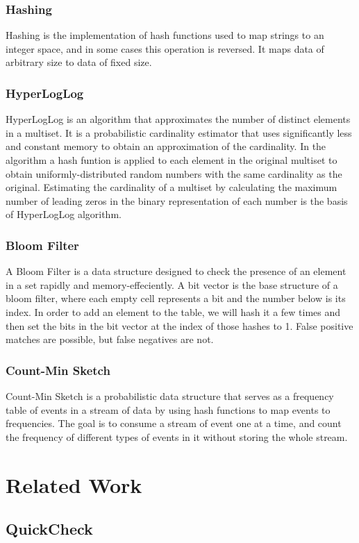 \documentclass[preprint,nocopyrightspace]{sig-alternate}
\begin{document}
\subsubsection{Hashing}
Hashing is the implementation of hash functions used to map strings to an integer space, and in some cases this operation is reversed. It maps data of arbitrary size to data of fixed size.
\subsubsection{HyperLogLog}	
HyperLogLog is an algorithm that approximates the number of distinct elements in a multiset. It is a probabilistic cardinality estimator that uses significantly less and constant memory to obtain an approximation of the cardinality. In the algorithm a hash funtion is applied to each element in the original multiset to obtain uniformly-distributed random numbers with the same cardinality as the original. Estimating the cardinality of a multiset by calculating the maximum number of leading zeros in the binary representation of each number is the basis of HyperLogLog algorithm.
\subsubsection{Bloom Filter}
A Bloom Filter is a data structure designed to check the presence of an element in a set rapidly and memory-effeciently. A bit vector is the base structure of a bloom filter, where each empty cell represents a bit and the number below is its index. In order to add an element to the table, we will hash it a few times and then set the bits in the bit vector at the index of those hashes to 1. False positive matches are possible, but false negatives are not.
\subsubsection{Count-Min Sketch}
Count-Min Sketch is a probabilistic data structure that serves as a frequency table of events in a stream of data by using hash functions to map events to frequencies. The goal is to consume a stream of event one at a time, and count the frequency of different types of events in it without storing the whole stream.
\section{Related Work}
\subsection{QuickCheck}
\end{document}
